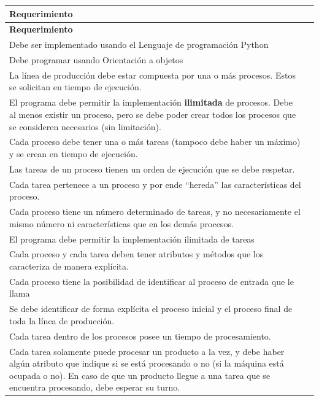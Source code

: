 \documentclass[12pt,letterpaper]{article}
\newcommand{\cmark}{\textcolor{checkgreen}{\ding{51}}}
\begin{document}
\vspace{0.5em}
\begin{longtable}{|p{13cm}|C{1.5cm}|}
\hline
\textbf{Requerimiento} & \textbf{} \\
\hline
\endfirsthead
\hline
\textbf{Requerimiento} & \\
\hline
\endhead
Debe ser implementado usando el Lenguaje de programación Python & \cmark \\
\hline
Debe programar usando Orientación a objetos & \cmark \\
\hline
La línea de producción debe estar compuesta por una o más procesos. Estos se solicitan en tiempo de ejecución. & \cmark \\
\hline
El programa debe permitir la implementación \textbf{ilimitada} de procesos. Debe al menos existir un proceso, pero se debe poder crear todos los procesos que se consideren necesarios (sin limitación). & \cmark \\
\hline
Cada proceso debe tener una o más tareas (tampoco debe haber un máximo) y se crean en tiempo de ejecución. & \cmark \\
\hline
Las tareas de un proceso tienen un orden de ejecución que se debe respetar. & \cmark \\
\hline
Cada tarea pertenece a un proceso y por ende ``hereda'' las características del proceso. & \cmark \\
\hline
Cada proceso tiene un número determinado de tareas, y no necesariamente el mismo número ni características que en los demás procesos. & \cmark \\
\hline
El programa debe permitir la implementación ilimitada de tareas & \cmark \\
\hline
Cada proceso y cada tarea deben tener atributos y métodos que los caracteriza de manera explícita. & \cmark \\
\hline
Cada proceso tiene la posibilidad de identificar al proceso de entrada que le llama & \cmark \\
\hline
Se debe identificar de forma explícita el proceso inicial y el proceso final de toda la línea de producción. & \cmark \\
\hline
Cada tarea dentro de los procesos posee un tiempo de procesamiento. & \cmark \\
\hline
Cada tarea solamente puede procesar un producto a la vez, y debe haber algún atributo que indique si se está procesando o no (si la máquina está ocupada o no). En caso de que un producto llegue a una tarea que se encuentra procesando, debe esperar su turno. & \cmark \\

\end{longtable}
\end{document}
